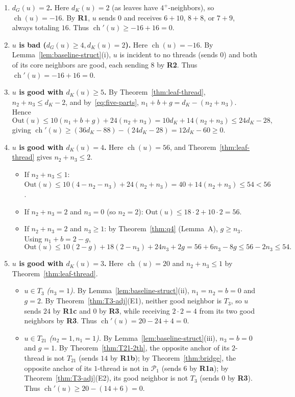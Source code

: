 \documentclass[11pt,a4paper]{article}
\theoremstyle{definition}
\newcommand{\ch}{\operatorname{ch}}
\newcommand{\Ppoor}{\mathcal{P}_1}
\begin{document}
\begin{enumerate}[leftmargin=*,itemsep=3pt]
  \item \textbf{$d_G(u) = 2$.} Here $d_K(u) = 2$ (as leaves have $4^+$-neighbors), so $\ch(u) = -16$. By \textbf{R1}, $u$ sends $0$ and receives $6+10$, $8+8$, or $7+9$, always totaling $16$. Thus $\ch'(u) \ge -16 + 16 = 0$.
  \item \textbf{$u$ is bad ($d_G(u) \ge 4, d_K(u) = 2$).} Here $\ch(u) = -16$. By Lemma~\ref{lem:baseline-struct}(i), $u$ is incident to no threads (sends $0$) and both of its core neighbors are good, each sending $8$ by \textbf{R2}. Thus $\ch'(u) = -16 + 16 = 0$.
  \item \textbf{$u$ is good with $d_K(u) \ge 5$.} By Theorem~\ref{thm:leaf-thread}, $n_2 + n_3 \le d_K - 2$, and by~\eqref{eq:five-parts}, $n_1 + b + g = d_K - (n_2 + n_3)$. Hence
  \[
    \mathrm{Out}(u) \le 10(n_1 + b + g) + 24(n_2 + n_3) = 10 d_K + 14(n_2 + n_3) \le 24 d_K - 28,
  \]
  giving $\ch'(u) \ge (36 d_K - 88) - (24 d_K - 28) = 12 d_K - 60 \ge 0$.
  \item \textbf{$u$ is good with $d_K(u) = 4$.} Here $\ch(u) = 56$, and Theorem~\ref{thm:leaf-thread} gives $n_2 + n_3 \le 2$.
  \begin{itemize}[leftmargin=*,itemsep=1pt]
    \item If $n_2 + n_3 \le 1$: $\mathrm{Out}(u) \le 10(4 - n_2 - n_3) + 24(n_2 + n_3) = 40 + 14(n_2 + n_3) \le 54 < 56$.
    \item If $n_2 + n_3 = 2$ and $n_3 = 0$ (so $n_2 = 2$): $\mathrm{Out}(u) \le 18 \cdot 2 + 10 \cdot 2 = 56$.
    \item If $n_2 + n_3 = 2$ and $n_3 \ge 1$: by Theorem~\ref{thm:q4} (Lemma~A), $g \ge n_3$. Using $n_1 + b = 2 - g$,
    \[
      \mathrm{Out}(u) \le 10(2 - g) + 18(2 - n_3) + 24 n_3 + 2g = 56 + 6 n_3 - 8 g \le 56 - 2 n_3 \le 54.
    \]
  \end{itemize}
  \item \textbf{$u$ is good with $d_K(u) = 3$.} Here $\ch(u) = 20$ and $n_2 + n_3 \le 1$ by Theorem~\ref{thm:leaf-thread}.
  \begin{itemize}[leftmargin=*,itemsep=2pt]
    \item \emph{$u \in T_3$ ($n_3 = 1$).} By Lemma~\ref{lem:baseline-struct}(ii), $n_1 = n_2 = b = 0$ and $g = 2$. By Theorem~\ref{thm:T3-adj}(E1), neither good neighbor is $T_3$, so $u$ sends $24$ by \textbf{R1c} and $0$ by \textbf{R3}, while receiving $2 \cdot 2 = 4$ from its two good neighbors by \textbf{R3}. Thus $\ch'(u) = 20 - 24 + 4 = 0$.
    \item \emph{$u \in T_{21}$ ($n_2 = 1, n_1 = 1$).} By Lemma~\ref{lem:baseline-struct}(iii), $n_3 = b = 0$ and $g = 1$. By Theorem~\ref{thm:T21-2th}, the opposite anchor of its $2$-thread is not $T_{21}$ (sends $14$ by \textbf{R1b}); by Theorem~\ref{thm:bridge}, the opposite anchor of its $1$-thread is not in $\Ppoor$ (sends $6$ by \textbf{R1a}); by Theorem~\ref{thm:T3-adj}(E2), its good neighbor is not $T_3$ (sends $0$ by \textbf{R3}). Thus $\ch'(u) \ge 20 - (14 + 6) = 0$.

\end{itemize}
\end{enumerate}
\end{document}
